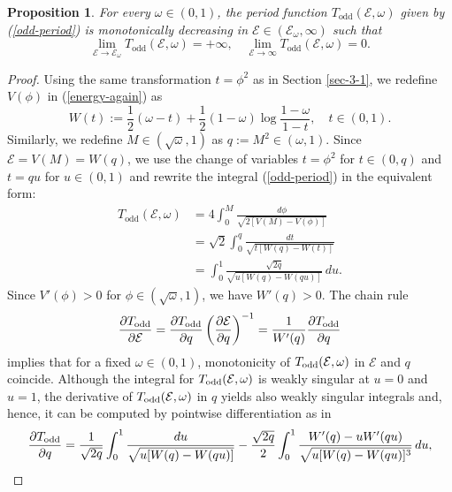 \documentclass[12pt,reqno]{amsart}
\numberwithin{equation}{section}
\numberwithin{figure}{section}
\newtheorem{proposition}[theorem]{Proposition}
\begin{document}
\begin{proposition}
	\label{prop-odd-period}
		For every $\omega \in (0,1)$, the period function $T_\mathrm{odd}(\mathcal E,\omega)$ given by (\ref{odd-period}) is monotonically decreasing in $\mathcal{E} \in (\mathcal{E}_{\omega},\infty)$ such that 
		$$
\lim_{\mathcal{E}\to \mathcal{E}_{\omega}} T_\mathrm{odd}(\mathcal E,\omega) = +\infty,  \quad \lim_{\mathcal{E} \to \infty} T_\mathrm{odd}(\mathcal E,\omega) = 0.
		$$
\end{proposition}

\begin{proof}
Using the same transformation $t = \phi^2$ as in Section \ref{sec-3-1}, we
redefine $V(\phi)$ in (\ref{energy-again}) as 
		\begin{equation*}
		W(t) := \frac{1}{2} (\omega - t) + \frac{1}{2}(1 - \omega) 
		\log \frac{1-\omega}{1-t}, \quad t\in (0,1).
		\end{equation*} 
Similarly, we redefine $M \in (\sqrt{\omega},1)$ as $q := M^2 \in (\omega, 1)$. Since $\mathcal E = V(M) = W(q)$, we use the change of variables $t = \phi^2$ for $t \in (0,q)$ and $t = q u$ for $u \in (0,1)$ and rewrite the integral (\ref{odd-period}) in the equivalent form:
		\begin{align*}
T_\mathrm{odd}(\mathcal E, \omega) &= 4 \int_0^{M} \frac{d\phi}{\sqrt{2[V(M) - V(\phi) ]}} \\
&= \sqrt{2}\int_0^{q} \frac{dt}{\sqrt{t[W(q) - W(t)]}} \\
		&=  \int_0^{1} \frac{\sqrt{2q}}{\sqrt{u[W(q) - W(qu)]}}\,du.
		\end{align*} 
Since $V'(\phi) > 0$ for $\phi \in (\sqrt{\omega},1)$, we have $W'(q) > 0$. The chain rule
\begin{equation*}
\frac{\partial T_{\rm odd}}{\partial \mathcal E} = \frac{\partial T_{\rm odd}}{\partial q} \left ( \frac{\partial \mathcal E }{\partial q} \right )^{-1} = \frac{1}{W'(q)} \frac{\partial T_{\rm odd}}{\partial q}
\end{equation*} 	
implies that for a fixed $\omega \in (0,1)$, monotonicity of $T_{\rm odd}(\mathcal{E},\omega)$ in $\mathcal{E}$ and $q$ coincide. 
Although the integral for $T_{\rm odd}(\mathcal{E},\omega)$ is weakly singular at $u = 0$ and $u = 1$, the derivative of $T_{\rm odd}(\mathcal{E},\omega)$ in $q$ yields also weakly singular integrals and, hence, it can be computed by pointwise differentiation as in 
		\begin{equation*}
		\frac{\partial T_{\rm odd}}{\partial q} = \frac{1}{\sqrt{2q}}  \int_0^{1} \frac{du}{\sqrt{u[W(q) - W(qu)]}} - \frac{\sqrt{2q}}{2}  \int_0^{1} \frac{W'(q) - uW'(qu)}{\sqrt{u [W(q) - W(qu)]^3}}\,du, 

\end{equation*}
\end{proof}
\end{document}
